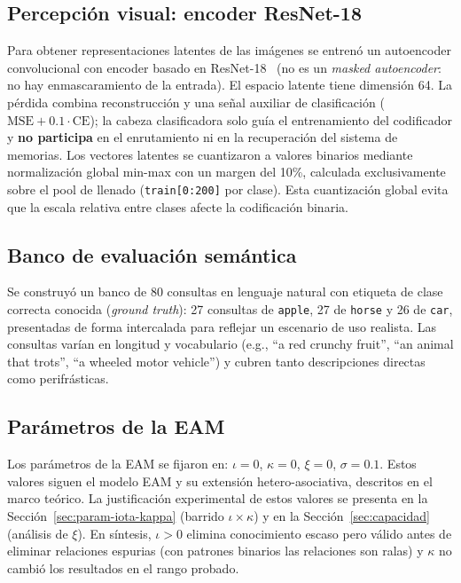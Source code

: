 \subsection{Percepción visual: encoder ResNet-18}
\label{sec:percepcion}

Para obtener representaciones latentes de las imágenes se entrenó un autoencoder convolucional con encoder basado en ResNet-18~\cite{he2016resnet} (no es un \textit{masked autoencoder}: no hay enmascaramiento de la entrada).
El espacio latente tiene dimensión 64.
La pérdida combina reconstrucción y una señal auxiliar de clasificación ($\text{MSE} + 0.1\cdot\text{CE}$); la cabeza clasificadora solo guía el entrenamiento del codificador y \textbf{no participa} en el enrutamiento ni en la recuperación del sistema de memorias.
Los vectores latentes se cuantizaron a valores binarios mediante normalización global min-max con un margen del 10\%, calculada exclusivamente sobre el pool de llenado (\texttt{train[0:200]} por clase).
Esta cuantización global evita que la escala relativa entre clases afecte la codificación binaria.

\subsection{Banco de evaluación semántica}
\label{sec:banco}

Se construyó un banco de 80 consultas en lenguaje natural con etiqueta de clase correcta conocida (\textit{ground truth}): 27 consultas de \texttt{apple}, 27 de \texttt{horse} y 26 de \texttt{car}, presentadas de forma intercalada para reflejar un escenario de uso realista.
Las consultas varían en longitud y vocabulario (e.g., ``a red crunchy fruit'', ``an animal that trots'', ``a wheeled motor vehicle'') y cubren tanto descripciones directas como perifrásticas.

\subsection{Parámetros de la EAM}
\label{sec:parametros}

Los parámetros de la EAM se fijaron en:
$\iota = 0$, $\kappa = 0$, $\xi = 0$, $\sigma = 0.1$.
Estos valores siguen el modelo EAM y su extensión hetero-asociativa,
descritos en el marco teórico.
La justificación experimental de estos valores se presenta en la Sección~\ref{sec:param-iota-kappa} (barrido $\iota \times \kappa$) y en la Sección~\ref{sec:capacidad} (análisis de $\xi$).
En síntesis, $\iota > 0$ elimina conocimiento escaso pero válido antes de eliminar relaciones espurias (con patrones binarios las relaciones son ralas) y $\kappa$ no cambió los resultados en el rango probado.

